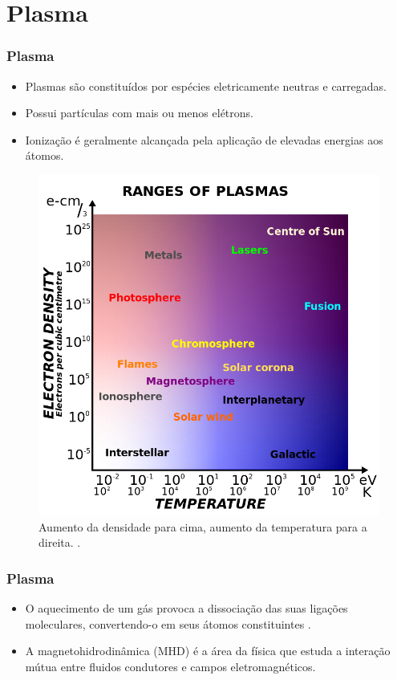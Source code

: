 \documentclass[aspectratio=169]{beamer}
\begin{document}
	\section{Plasma}
\begin{frame}
		\frametitle{Plasma}
		\begin{minipage}[H]{.4\textwidth}
		\begin{itemize}
		\item  Plasmas são constituídos por espécies eletricamente neutras e carregadas.
		\item  Possui partículas com mais ou menos elétrons.
		\item  Ionização é geralmente alcançada pela aplicação de elevadas energias aos átomos.

		\end{itemize}


		\end{minipage}
		\hfill
		\begin{minipage}[h]{.45\textwidth}
			\begin{figure}
				\centering
\includegraphics[width=.8\linewidth]{faixaplasma.png}   
\caption{Aumento da densidade para cima, aumento da temperatura para a direita. \cite{figplasma}.}
\end{figure}
		\end{minipage}
	\end{frame}
	\begin{frame}
		\frametitle{Plasma}
		\begin{itemize}
				\item O aquecimento de um gás provoca a dissociação das suas ligações moleculares, convertendo-o em seus átomos constituintes \cite{tokamaks}.
	\item A magnetohidrodinâmica (MHD) é a área da física que estuda a interação mútua entre fluidos condutores e campos eletromagnéticos. 
\end{itemize}

\end{frame}
\end{document}
